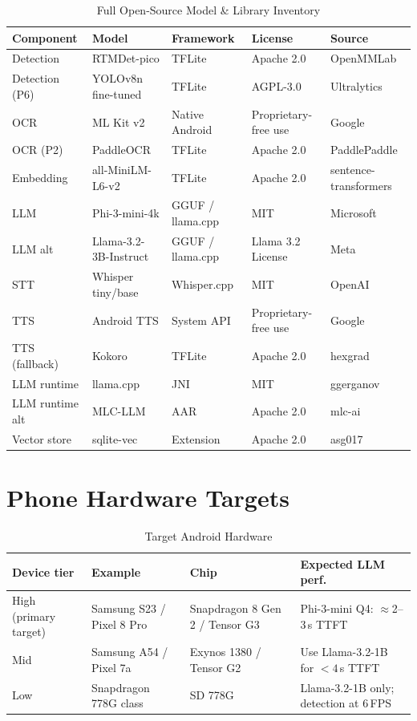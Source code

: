 \documentclass[11pt,a4paper]{article}
\begin{document}
\begin{table}[h!]
\centering
\renewcommand{\arraystretch}{1.3}
\begin{tabularx}{\textwidth}{L{3cm} L{2.5cm} L{2.5cm} L{2cm} X}
\toprule
\textbf{Component} & \textbf{Model} & \textbf{Framework} & \textbf{License} & \textbf{Source} \\
\midrule
Detection & RTMDet-pico & TFLite & Apache 2.0 & OpenMMLab \\
Detection (P6) & YOLOv8n fine-tuned & TFLite & AGPL-3.0 & Ultralytics \\
OCR & ML Kit v2 & Native Android & Proprietary-free use & Google \\
OCR (P2) & PaddleOCR & TFLite & Apache 2.0 & PaddlePaddle \\
Embedding & all-MiniLM-L6-v2 & TFLite & Apache 2.0 & sentence-transformers \\
LLM & Phi-3-mini-4k & GGUF / llama.cpp & MIT & Microsoft \\
LLM alt & Llama-3.2-3B-Instruct & GGUF / llama.cpp & Llama 3.2 License & Meta \\
STT & Whisper tiny/base & Whisper.cpp & MIT & OpenAI \\
TTS & Android TTS & System API & Proprietary-free use & Google \\
TTS (fallback) & Kokoro & TFLite & Apache 2.0 & hexgrad \\
LLM runtime & llama.cpp & JNI & MIT & ggerganov \\
LLM runtime alt & MLC-LLM & AAR & Apache 2.0 & mlc-ai \\
Vector store & sqlite-vec & Extension & Apache 2.0 & asg017 \\
\bottomrule
\end{tabularx}
\caption{Full Open-Source Model \& Library Inventory}
\end{table}

\section{Phone Hardware Targets}

\begin{table}[h!]
\centering
\renewcommand{\arraystretch}{1.3}
\begin{tabularx}{\textwidth}{L{3.5cm} L{3cm} L{2.5cm} X}
\toprule
\textbf{Device tier} & \textbf{Example} & \textbf{Chip} & \textbf{Expected LLM perf.} \\
\midrule
High (primary target) & Samsung S23 / Pixel 8 Pro & Snapdragon 8 Gen 2 / Tensor G3 & Phi-3-mini Q4: $\approx$2--3\,s TTFT \\
Mid & Samsung A54 / Pixel 7a & Exynos 1380 / Tensor G2 & Use Llama-3.2-1B for $<4$\,s TTFT \\
Low & Snapdragon 778G class & SD 778G & Llama-3.2-1B only; detection at 6\,FPS \\
\bottomrule
\end{tabularx}
\caption{Target Android Hardware}
\end{table}

\end{document}
